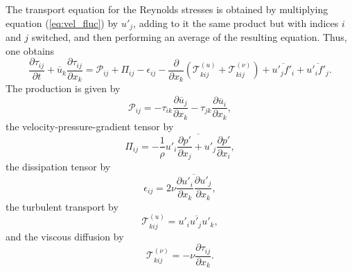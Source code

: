 \documentclass[oneside,a4paper,11pt]{report}
\newcommand{\uavg}{\overline{u}}
\newcommand{\ffluc}{f'}
\newcommand{\pfluc}{p'}
\newcommand{\ufluc}{u'}
\newcommand{\rs}{\tau}          %
\begin{document}
The transport equation for the Reynolds stresses is obtained by multiplying equation (\ref{eq:vel_fluc}) by $\ufluc_j$, adding to it the same product but with indices $i$ and $j$ switched, and then performing an average of the resulting equation. Thus, one obtains
\begin{equation}
\label{rs_transport}
\frac{\partial \rs_{ij}}{\partial t} + \uavg_k \frac{\partial \rs_{ij}}{\partial x_k} = \mathcal{P}_{ij} + \Pi_{ij} - \epsilon_{ij} - \frac{\partial}{\partial x_k} \left ( \mathcal{T}^{(u)}_{kij} + \mathcal{T}^{(\nu)}_{kij} \right ) + \overline{ \ufluc_j \ffluc_i } + \overline{ \ufluc_i \ffluc_j }.
\end{equation}
The production is given by
\begin{equation}
\mathcal{P}_{ij} = -\rs_{ik} \frac{\partial \uavg_j}{\partial x_k} - \rs_{jk} \frac{\partial \uavg_i}{\partial x_k},
\end{equation}
the velocity-pressure-gradient tensor by
\begin{equation}
\Pi_{ij} = -\frac{1}{\rho} \overline{ \ufluc_i \frac{\partial \pfluc}{\partial x_j} + \ufluc_j \frac{\partial \pfluc}{\partial x_i} },
\end{equation}
the dissipation tensor by
\begin{equation}
\epsilon_{ij} = 2 \nu \overline{ \frac{\partial \ufluc_i}{\partial x_k}\frac{\partial \ufluc_j}{\partial x_k} },
\end{equation}
the turbulent transport by
\begin{equation}
\mathcal{T}^{(u)}_{kij} = \overline{ \ufluc_i \ufluc_j \ufluc_k },
\end{equation}
and the viscous diffusion by
\begin{equation}
\mathcal{T}^{(\nu)}_{kij} = -\nu \frac{\partial \rs_{ij}}{\partial x_k}.
\end{equation}
\end{document}
